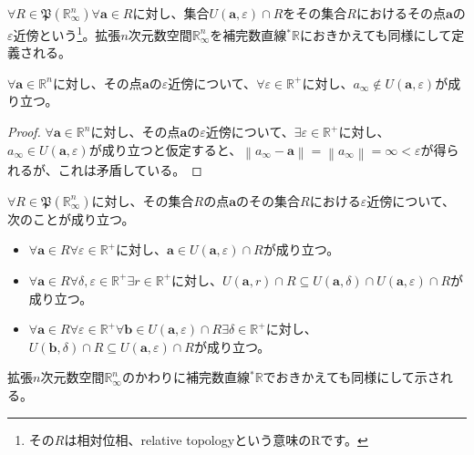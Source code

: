 \documentclass[dvipdfmx]{jsarticle}
\begin{document}
\begin{dfn}
$\forall R \in \mathfrak{P}\left( \mathbb{R}_{\infty}^{n} \right)\forall\mathbf{a} \in R$に対し、集合$U\left( \mathbf{a},\varepsilon \right) \cap R$をその集合$R$におけるその点$\mathbf{a}$の$\varepsilon$近傍という\footnote{その$R$は相対位相、relative topologyという意味のRです。}。拡張$n$次元数空間$\mathbb{R}_{\infty}^{n}$を補完数直線${}^{*}\mathbb{R}$におきかえても同様にして定義される。
\end{dfn}
\begin{thm}\label{4.1.3.3}
$\forall\mathbf{a} \in \mathbb{R}^{n}$に対し、その点$\mathbf{a}$の$\varepsilon$近傍について、$\forall\varepsilon \in \mathbb{R}^{+}$に対し、$a_{\infty} \notin U\left( \mathbf{a},\varepsilon \right)$が成り立つ。
\end{thm}
\begin{proof}
$\forall\mathbf{a} \in \mathbb{R}^{n}$に対し、その点$\mathbf{a}$の$\varepsilon$近傍について、$\exists\varepsilon \in \mathbb{R}^{+}$に対し、$a_{\infty} \in U\left( \mathbf{a},\varepsilon \right)$が成り立つと仮定すると、$\left\| a_{\infty} - \mathbf{a} \right\| = \left\| a_{\infty} \right\| = \infty < \varepsilon$が得られるが、これは矛盾している。
\end{proof}
\begin{thm}\label{4.1.3.4}
$\forall R \in \mathfrak{P}\left( \mathbb{R}_{\infty}^{n} \right)$に対し、その集合$R$の点$\mathbf{a}$のその集合$R$における$\varepsilon$近傍について、次のことが成り立つ。
\begin{itemize}
\item
  $\forall\mathbf{a} \in R\forall\varepsilon \in \mathbb{R}^{+}$に対し、$\mathbf{a} \in U\left( \mathbf{a},\varepsilon \right) \cap R$が成り立つ。
\item
  $\forall\mathbf{a} \in R\forall\delta,\varepsilon \in \mathbb{R}^{+}\exists r \in \mathbb{R}^{+}$に対し、$U\left( \mathbf{a},r \right) \cap R \subseteq U\left( \mathbf{a},\delta \right) \cap U\left( \mathbf{a},\varepsilon \right) \cap R$が成り立つ。
\item
  $\forall\mathbf{a} \in R\forall\varepsilon \in \mathbb{R}^{+}\forall\mathbf{b} \in U\left( \mathbf{a},\varepsilon \right) \cap R\exists\delta \in \mathbb{R}^{+}$に対し、$U\left( \mathbf{b},\delta \right) \cap R \subseteq U\left( \mathbf{a},\varepsilon \right) \cap R$が成り立つ。
\end{itemize}
拡張$n$次元数空間$\mathbb{R}_{\infty}^{n}$のかわりに補完数直線${}^{*}\mathbb{R}$でおきかえても同様にして示される。
\end{thm}
\end{document}
